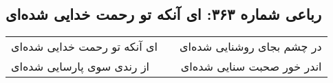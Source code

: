 \begin{center}
\section*{رباعی شماره ۳۶۳: ای آنکه تو رحمت خدایی شده‌ای}
\label{sec:sh363}
\begin{longtable}{l p{0.5cm} r}
ای آنکه تو رحمت خدایی شده‌ای
&&
در چشم بجای روشنایی شده‌ای
\\
از رندی سوی پارسایی شده‌ای
&&
اندر خور صحبت سنایی شده‌ای
\\
\end{longtable}
\end{center}
